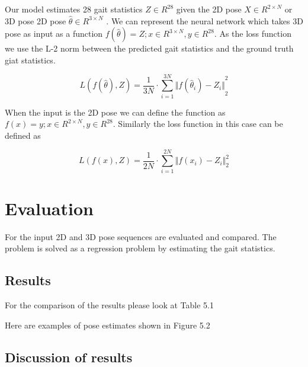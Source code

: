 Our model estimates 28 gait statistics $Z \in R^{28}$ given the 2D pose $X \in R^{2\times N}$ or 3D pose 2D pose $\hat{\theta} \in R^{3\times N}$ . We can represent the neural network which takes 3D pose as input as a function $f(\hat{\theta}) = Z ; x \in R^{3\times N}, y \in R^{28} $. As the loss function we use the L-2 norm between the predicted gait statistics and the ground truth giat statistics.

\begin{equation}	
    L(f(\hat{\theta}),Z) = \frac{1}{3N} \cdot \sum_{i=1}^{3N} {\Vert f(\hat{\theta}_i)-Z_i \Vert}_2^2
\end{equation}

When the input is the 2D pose we can define the function as  $f(x) = y ; x \in R^{2\times N}, y \in R^{28} $. Similarly the loss function in this case can be defined as

\begin{equation}	
    L(f(x),Z) = \frac{1}{2N} \cdot \sum_{i=1}^{2N} {\Vert f(x_i)-Z_i \Vert}_2^2
\end{equation}

\section{Evaluation}

For the input 2D and 3D pose sequences are evaluated and compared. The problem is solved as a regression problem by estimating the gait statistics.

\subsection{Results}

For the comparison of the results please look at Table 5.1

Here are examples of pose estimates shown in Figure 5.2

\subsection{Discussion of results}


